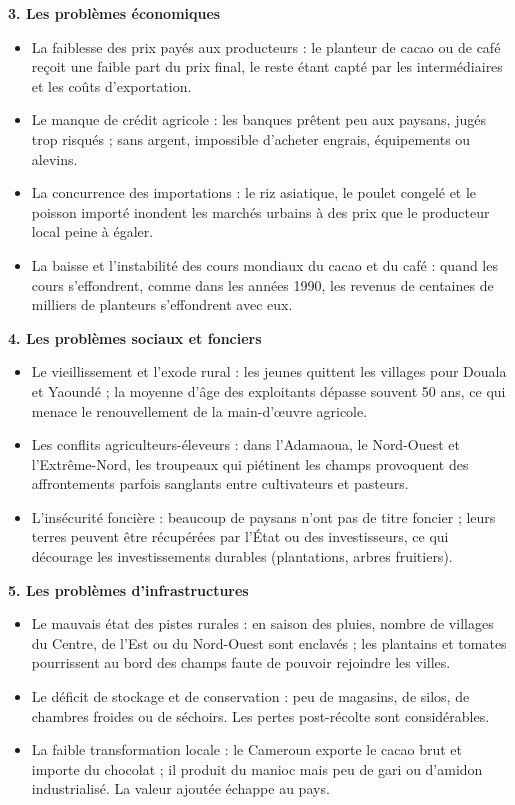 \documentclass[11pt]{article}
\newcommand{\cle}[1]{{\popxbold\color{popdark}#1}}
\begin{document}
\textbf{3. Les problèmes économiques}\par

\begin{itemize}
\item La \cle{faiblesse des prix} payés aux producteurs : le planteur de cacao ou de café reçoit une faible part du prix final, le reste étant capté par les intermédiaires et les coûts d'exportation.
\item Le manque de \cle{crédit agricole} : les banques prêtent peu aux paysans, jugés trop risqués ; sans argent, impossible d'acheter engrais, équipements ou alevins.
\item La \cle{concurrence des importations} : le riz asiatique, le poulet congelé et le poisson importé inondent les marchés urbains à des prix que le producteur local peine à égaler.
\item La baisse et l'instabilité des \cle{cours mondiaux} du cacao et du café : quand les cours s'effondrent, comme dans les années 1990, les revenus de centaines de milliers de planteurs s'effondrent avec eux.
\end{itemize}

\textbf{4. Les problèmes sociaux et fonciers}\par

\begin{itemize}
\item Le \cle{vieillissement} et l'\cle{exode rural} : les jeunes quittent les villages pour Douala et Yaoundé ; la moyenne d'âge des exploitants dépasse souvent 50 ans, ce qui menace le renouvellement de la main-d'œuvre agricole.
\item Les \cle{conflits agriculteurs-éleveurs} : dans l'Adamaoua, le Nord-Ouest et l'Extrême-Nord, les troupeaux qui piétinent les champs provoquent des affrontements parfois sanglants entre cultivateurs et pasteurs.
\item L'\cle{insécurité foncière} : beaucoup de paysans n'ont pas de titre foncier ; leurs terres peuvent être récupérées par l'État ou des investisseurs, ce qui décourage les investissements durables (plantations, arbres fruitiers).
\end{itemize}

\textbf{5. Les problèmes d'infrastructures}\par

\begin{itemize}
\item Le mauvais état des \cle{pistes rurales} : en saison des pluies, nombre de villages du Centre, de l'Est ou du Nord-Ouest sont enclavés ; les plantains et tomates pourrissent au bord des champs faute de pouvoir rejoindre les villes.
\item Le déficit de \cle{stockage et de conservation} : peu de magasins, de silos, de chambres froides ou de séchoirs. Les \cle{pertes post-récolte} sont considérables.
\item La faible \cle{transformation locale} : le Cameroun exporte le cacao brut et importe du chocolat ; il produit du manioc mais peu de gari ou d'amidon industrialisé. La valeur ajoutée échappe au pays.
\end{itemize}
\end{document}
